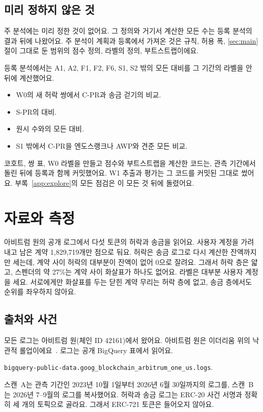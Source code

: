 \subsection{미리 정하지 않은 것}

주 분석에는 미리 정한 것이 없어요. 그 정의와 거기서 계산한 모든 수는 등록 분석의 결과 뒤에 나왔어요. 주 분석이 계획과 등록에서 가져온 것은 규칙, 허용 폭, \ref{sec:main}절이 그대로 둔 범위의 점수 정의, 라벨의 정의, 부트스트랩이에요.

등록 분석에서는 A1, A2, F1, F2, F6, S1, S2 밖의 모든 대비를 그 기간의 라벨을 안 뒤에 계산했어요.
\begin{itemize}
\item W0의 새 허락 쌍에서 C-PR과 송금 걷기의 비교.
\item S-PR의 대비.
\item 원시 수와의 모든 대비.
\item S1 밖에서 C-PR을 엔도스랭크나 AWP와 견준 모든 비교.
\end{itemize}

코호트, 쌍 표, W0 라벨을 만들고 점수와 부트스트랩을 계산한 코드는, 관측 기간에서 돌린 뒤에 등록과 함께 커밋했어요. W1 추출과 평가는 그 코드를 커밋된 그대로 썼어요. 부록~\ref{app:explore}의 모든 점검은 이 모든 것 뒤에 돌렸어요.

\section{자료와 측정}
\label{sec:data}

\begin{yoji}
아비트럼 원의 공개 로그에서 다섯 토큰의 허락과 송금을 읽어요. 사용자 계정을 가려내고 남은 계약 1,829,719개만 점으로 둬요. 허락은 송금 로그로 다시 계산한 잔액까지만 세는데, 계약 사이 허락의 대부분이 잔액이 없어 0으로 잘려요. 그래서 허락 층은 얇고, 스펜더의 약 27\%는 계약 사이 화살표가 하나도 없어요. 라벨은 대부분 사용자 계정을 세요. 서로에게만 화살표를 두는 닫힌 계약 무리는 허락 층에 없고, 송금 층에서도 순위를 좌우하지 않아요.
\end{yoji}

\subsection{출처와 사건}

모든 로그는 아비트럼 원(체인 ID 42161)에서 왔어요. 아비트럼 원은 이더리움 위의 낙관적 롤업이에요~\cite{kalodner2018arbitrum,thibault2022rollups}. 로그는 공개 BigQuery 표에서 읽어요.
\begin{center}
\texttt{\scriptsize bigquery-public-data.goog\_blockchain\_arbitrum\_one\_us.logs}.
\end{center}
스캔~A는 관측 기간인 2023년 10월 1일부터 2026년 6월 30일까지의 로그를, 스캔~B는 2026년 7–9월의 로그를 복사했어요. 허락과 송금 로그는 ERC-20 사건 서명과 정확히 세 개의 토픽으로 골라요. 그래서 ERC-721 토큰은 들어오지 않아요.

